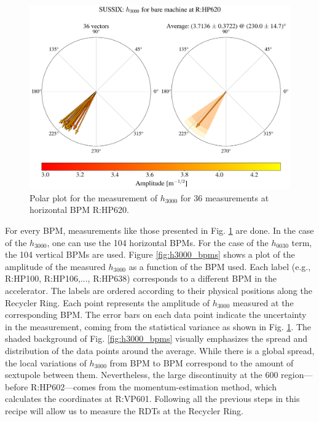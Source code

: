 \begin{figure}[H]
    \centering
    \includegraphics[width=\columnwidth]{chapter4/h3000_RHP620.png}
    \caption{Polar plot for the measurement of $h_{3000}$ for 36 measurements at horizontal BPM R:HP620.}
    \label{fig:h3000_620}
\end{figure}

For every BPM, measurements like those presented in Fig. \ref{fig:h3000_620} are done. In the case of the $h_{3000}$, one can use the 104 horizontal BPMs. For the case of the $h_{0030}$ term, the 104 vertical BPMs are used. Figure \ref{fig:h3000_bpms} shows a plot of the amplitude of the measured $h_{3000}$ as a function of the BPM used. Each label (e.g., R:HP100, R:HP106,..., R:HP638) corresponds to a different BPM in the accelerator. The labels are ordered according to their physical positions along the Recycler Ring. Each point represents the amplitude of $h_{3000}$ measured at the corresponding BPM. The error bars on each data point indicate the uncertainty in the measurement, coming from the statistical variance as shown in Fig. \ref{fig:h3000_620}. The shaded background of Fig. \ref{fig:h3000_bpms} visually emphasizes the spread and distribution of the data points around the average. While there is a global spread, the local variations of $h_{3000}$ from BPM to BPM correspond to the amount of sextupole between them. Nevertheless, the large discontinuity at the 600 region---before R:HP602---comes from the momentum-estimation method, which calculates the coordinates at R:VP601. Following all the previous steps in this recipe will allow us to measure the RDTs at the Recycler Ring.

